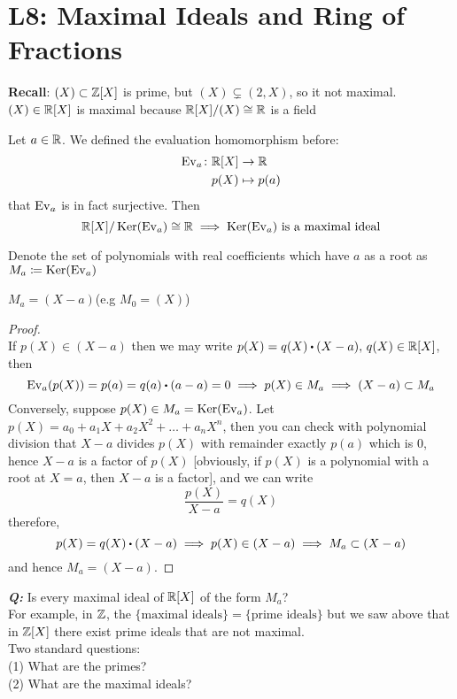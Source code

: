 \documentclass[../Main.tex]{subfiles}
\begin{document}
\chapter{L8: Maximal Ideals and Ring of Fractions}

\textbf{Recall}: $(X) \subset \mathbb{Z}[X]$ is prime, but $(X)\subsetneq (2,X)$, so it not maximal.\\
$(X)\in \mathbb{R}[X]$ is maximal because $\mathbb{R}[X]/(X) \cong \mathbb{R}$ is a field

\begin{example}
	Let $a\in \mathbb{R}$. We defined the evaluation homomorphism before:
	\begin{align*}
	\operatorname{Ev}_a\colon \mathbb{R}[X] &\to \mathbb{R} \\
	p(X) &\mapsto p(a)
	\end{align*}
	\Obs that $\operatorname{Ev}_a$ is in fact surjective. Then
	\[\mathbb{R}[X]/\operatorname{Ker}(\operatorname{Ev}_a) \cong \mathbb{R} \implies \operatorname{Ker}(\operatorname{Ev}_a) \text{ is a maximal ideal}\]
\end{example}
	Denote the set of polynomials with real coefficients which have $a$ as a root as $M_a\coloneqq \operatorname{Ker}(\operatorname{Ev}_a)$
	\begin{claim}
		$M_a = (X-a)$\quad (e.g $M_0 =(X)$)
	\end{claim}
	\begin{proof}~\\
		If $p(X) \in (X-a)$ then we may write $p(X)=q(X)\rdot (X-a),\, q(X)\in \R[X]$, then
		\[\ev_a(p(X)) = p(a) = q(a)\rdot (a-a)=0 \implies p(X)\in M_a \implies (X-a) \subset M_a\] 
		Conversely, suppose $p(X) \in M_a = \operatorname{Ker}(\operatorname{Ev}_a)$. Let $p(X) = a_0 + a_1X+a_2X^2+\dots+a_nX^n$, then you can check with polynomial division that $X-a$ divides $p(X)$ with remainder exactly $p(a)$ which is $0$, hence $X-a$ is a factor of $p(X)$ [obviously, if $p(X)$ is a polynomial with a root at $X=a$, then $X-a$ is a factor], and we can write
		\[\frac{p(X)}{X-a} = q(X)\]
		therefore,
		\[p(X)=q(X)\rdot (X-a)\implies p(X) \in (X-a) \implies M_a \subset (X-a) \]
		and hence $M_a =(X-a)$.
	\end{proof}
\textbf{\textit{Q:}} Is every maximal ideal of $\mathbb{R}[X]$ of the form $M_a$?\\
For example, in $\mathbb{Z}$, the $\{\text{maximal ideals}\} =\{\text{prime ideals}\}$ but we saw above that in $\mathbb{Z}[X]$ there exist prime ideals that are not maximal.\\
Two standard questions:\\
(1) What are the primes?\\
(2) What are the maximal ideals?
\end{document}
